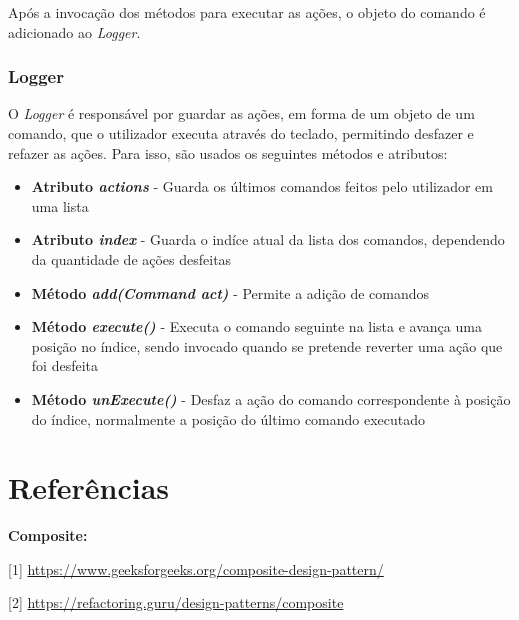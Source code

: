 \documentclass[10pt,portuguese]{article}
\begin{document}
\par Após a invocação dos métodos para executar as ações, o objeto do comando é adicionado ao \textit{Logger}.

\subsubsection{Logger}

\par O \textit{Logger} é responsável por guardar as ações, em forma de um objeto de um comando, que o utilizador executa através do teclado, permitindo desfazer e refazer as ações. Para isso, são usados os seguintes métodos e atributos:

\begin{itemize}
    \item \textbf{Atributo \textit{actions}} - Guarda os últimos comandos feitos pelo utilizador em uma lista
    \item \textbf{Atributo \textit{index}} - Guarda o indíce atual da lista dos comandos, dependendo da quantidade de ações desfeitas
    \item \textbf{Método \textit{add(Command act)}} - Permite a adição de comandos
    \item \textbf{Método \textit{execute()}} - Executa o comando seguinte na lista e avança uma posição no índice, sendo invocado quando se pretende reverter uma ação que foi desfeita
    \item \textbf{Método \textit{unExecute()}} - Desfaz a ação do comando correspondente à posição do índice, normalmente a posição do último comando executado
\end{itemize}





\clearpage

\section{Referências}





\vspace{5mm} %

\par \textbf{Composite:}

[1] \url{https://www.geeksforgeeks.org/composite-design-pattern/}

[2] \url{https://refactoring.guru/design-patterns/composite}
\end{document}
